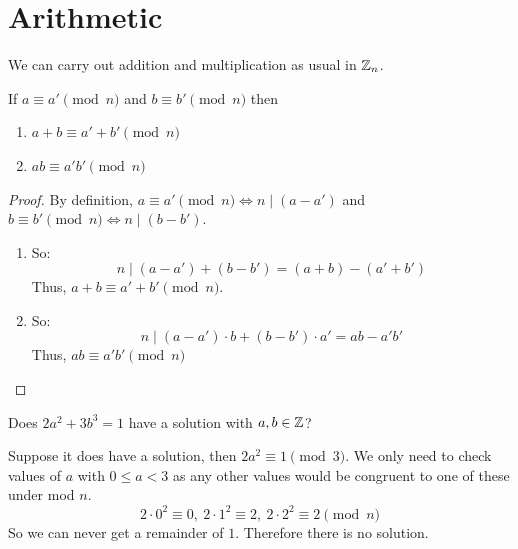 \documentclass[../main.tex]{subfiles}
\begin{document}
\section{Arithmetic}
We can carry out addition and multiplication as usual in $\mathbb{Z}_n$.
\begin{proposition}
  If $a \equiv a' \pmod{n}$ and $b \equiv b' \pmod{n}$ then
  \begin{enumerate}
    \item $a + b \equiv a' + b' \pmod{n}$
    \item $ab \equiv a'b' \pmod{n}$
  \end{enumerate}
\end{proposition}
\begin{proof}
  By definition, $a \equiv a' \pmod{n} \iff n \mid (a - a')$ and $b \equiv b' \pmod{n} \iff n \mid (b - b')$.
  \begin{enumerate}
    \item So:
      \[
        n \mid (a - a') + (b - b') = (a + b) - (a' + b')
      \]
      Thus, $a + b \equiv a' + b' \pmod{n}$.
    \item So:
      \[
        n \mid (a - a')\cdot b + (b - b') \cdot a' = ab - a'b'
      \]
      Thus, $ab \equiv a'b' \pmod{n}$
  \end{enumerate}
\end{proof}
\begin{example}
  Does $2a^2 + 3b^3 = 1$ have a solution with $a, b \in \mathbb{Z}$?

  Suppose it does have a solution, then $2a^2 \equiv 1 \pmod{3}$.
  We only need to check values of $a$ with $0 \leq a < 3$ as any other values would be congruent to one of these under mod $n$.
  \[
    2 \cdot 0^{2} \equiv 0,\ 2 \cdot 1^{2} \equiv 2,\ 2 \cdot 2^{2} \equiv 2 \pmod{n}
  \]
  So we can never get a remainder of $1$.
  Therefore there is no solution.
\end{example}
\end{document}
